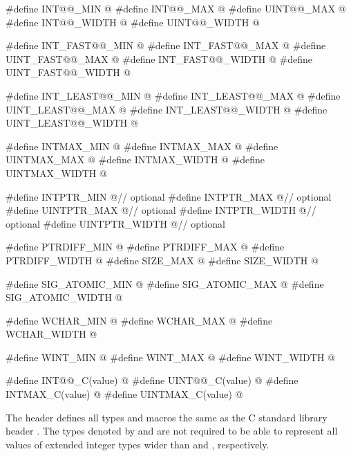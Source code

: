 \begin{codeblock}
#define INT@@_MIN          @\seebelow@
#define INT@@_MAX          @\seebelow@
#define UINT@@_MAX         @\seebelow@
#define INT@@_WIDTH        @\seebelow@
#define UINT@@_WIDTH       @\seebelow@

#define INT_FAST@@_MIN     @\seebelow@
#define INT_FAST@@_MAX     @\seebelow@
#define UINT_FAST@@_MAX    @\seebelow@
#define INT_FAST@@_WIDTH   @\seebelow@
#define UINT_FAST@@_WIDTH  @\seebelow@

#define INT_LEAST@@_MIN    @\seebelow@
#define INT_LEAST@@_MAX    @\seebelow@
#define UINT_LEAST@@_MAX   @\seebelow@
#define INT_LEAST@@_WIDTH  @\seebelow@
#define UINT_LEAST@@_WIDTH @\seebelow@

#define INTMAX_MIN        @\seebelow@
#define INTMAX_MAX        @\seebelow@
#define UINTMAX_MAX       @\seebelow@
#define INTMAX_WIDTH      @\seebelow@
#define UINTMAX_WIDTH     @\seebelow@

#define INTPTR_MIN        @\seebelow@              // optional
#define INTPTR_MAX        @\seebelow@              // optional
#define UINTPTR_MAX       @\seebelow@              // optional
#define INTPTR_WIDTH      @\seebelow@              // optional
#define UINTPTR_WIDTH     @\seebelow@              // optional

#define PTRDIFF_MIN       @\seebelow@
#define PTRDIFF_MAX       @\seebelow@
#define PTRDIFF_WIDTH     @\seebelow@
#define SIZE_MAX          @\seebelow@
#define SIZE_WIDTH        @\seebelow@

#define SIG_ATOMIC_MIN    @\seebelow@
#define SIG_ATOMIC_MAX    @\seebelow@
#define SIG_ATOMIC_WIDTH  @\seebelow@

#define WCHAR_MIN         @\seebelow@
#define WCHAR_MAX         @\seebelow@
#define WCHAR_WIDTH       @\seebelow@

#define WINT_MIN          @\seebelow@
#define WINT_MAX          @\seebelow@
#define WINT_WIDTH        @\seebelow@

#define INT@@_C(value)     @\seebelow@
#define UINT@@_C(value)    @\seebelow@
#define INTMAX_C(value)   @\seebelow@
#define UINTMAX_C(value)  @\seebelow@
\end{codeblock}

\pnum
The header defines all types and macros the same as
the C standard library header .
The types denoted by  and 
are not required to be able to represent all values of extended integer types
wider than  and , respectively.

